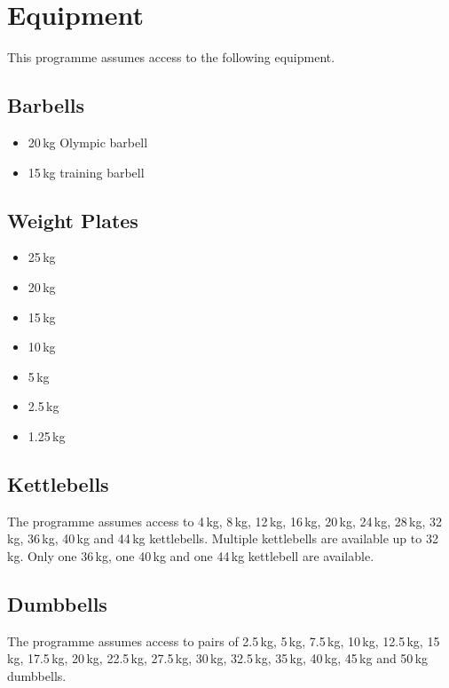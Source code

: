 \documentclass[11pt,a4paper]{article}
\begin{document}
\newpage
\appendix
{}

\section{Equipment}

This programme assumes access to the following equipment.

\subsection{Barbells}

\begin{itemize}
\item 20\,kg Olympic barbell
\item 15\,kg training barbell
\end{itemize}

\subsection{Weight Plates}

\begin{itemize}
\item 25\,kg
\item 20\,kg
\item 15\,kg
\item 10\,kg
\item 5\,kg
\item 2.5\,kg
\item 1.25\,kg
\end{itemize}

\subsection{Kettlebells}

The programme assumes access to 4\,kg, 8\,kg, 12\,kg, 16\,kg, 20\,kg, 24\,kg, 28\,kg, 32\,kg, 36\,kg, 40\,kg and 44\,kg kettlebells. Multiple kettlebells are available up to 32\,kg. Only one 36\,kg, one 40\,kg and one 44\,kg kettlebell are available.

\subsection{Dumbbells}

The programme assumes access to pairs of 2.5\,kg, 5\,kg, 7.5\,kg, 10\,kg, 12.5\,kg, 15\,kg, 17.5\,kg, 20\,kg, 22.5\,kg, 27.5\,kg, 30\,kg, 32.5\,kg, 35\,kg, 40\,kg, 45\,kg and 50\,kg dumbbells.
\end{document}
